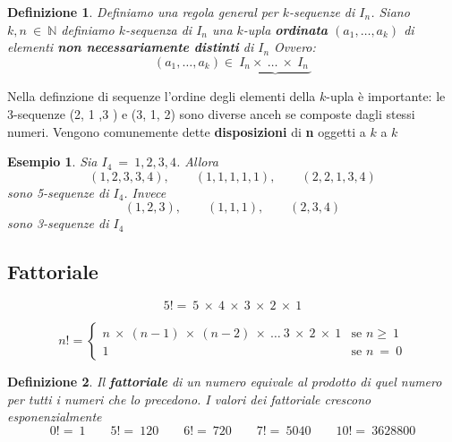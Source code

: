 \documentclass[12pt, a4paper]{article}
\theoremstyle{break}
\newtheorem{defn}{Definizione}
\theoremstyle{lemma}
\theoremstyle{lemma}
\theoremstyle{lemma}
\newtheorem{esem}{Esempio}
\begin{document}
\begin{defn}
  Definiamo una regola general per $k$-sequenze di $I_n$.
  Siano $k,n\ \in\ \mathbb{N}$ definiamo $k$-sequenza di $I_n$ una $k$-upla \textbf{ordinata} $(a_1,\ldots ,a_k)$ di elementi \textbf{non necessariamente distinti} di $I_n$ Ovvero:
  \begin{equation}
    (a_1,\ldots,a_k)\in\ \underbrace{I_n\times\ \ldots\ \times\ I_n\ }
  \end{equation}
\end{defn}

Nella definzione di sequenze l'ordine degli elementi della $k$-upla è importante: le 3-sequenze (2, 1 ,3 ) e (3, 1, 2) sono diverse anceh se composte dagli stessi numeri. Vengono comunemente dette \textbf{disposizioni} di \textbf{n} oggetti a $k$ a $k$

\begin{esem}
  Sia $I_4\ =\ {1,2,3,4}$. Allora
  \begin{equation}
    (1,2,3,3,4),\qquad (1,1,1,1,1),\qquad (2,2,1,3,4)
  \end{equation}
  sono 5-sequenze di $I_4$. Invece
  \begin{equation}
    (1,2,3),\qquad (1,1,1),\qquad (2,3,4)
  \end{equation}
  sono 3-sequenze di $I_4$
\end{esem}

\subsection{Fattoriale}

\begin{equation}
  5!=\ 5\ \times\ 4\ \times\ 3\ \times\ 2\ \times\ 1
\end{equation}

\begin{equation}
  n!=
  \begin{cases}
    n\ \times\ (n-1)\ \times\ (n-2)\ \times\ \ldots\ 3\ \times\ 2\
    \times\ 1 &  \mbox{se } n\geq\ 1 \\
    1 &  \mbox{se }n\ =\ 0
  \end{cases}
\end{equation}

\begin{defn}
  Il \textbf{fattoriale} di un numero equivale al prodotto di quel numero per tutti i numeri che lo precedono. I valori dei fattoriale crescono esponenzialmente
  \begin{equation}
    0!=\ 1 \qquad 5!=\ 120 \qquad 6!=\ 720 \qquad 7!=\ 5040 \qquad 10!=\ 3628800
  \end{equation}
\end{defn}

		
\end{document}
